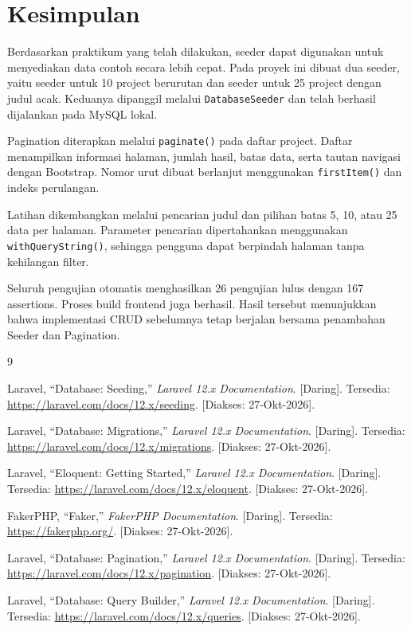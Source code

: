 \documentclass[a4paper,oneside,11pt]{book}
\renewcommand{\_}{\textunderscore\allowbreak{}}
\begin{document}
\chapter{Kesimpulan}

Berdasarkan praktikum yang telah dilakukan, seeder dapat digunakan
untuk menyediakan data contoh secara lebih cepat.
Pada proyek ini dibuat dua seeder, yaitu seeder untuk 10 project
berurutan dan seeder untuk 25 project dengan judul acak.
Keduanya dipanggil melalui \texttt{DatabaseSeeder} dan telah berhasil
dijalankan pada MySQL lokal.

Pagination diterapkan melalui \texttt{paginate()} pada daftar
project. Daftar menampilkan informasi halaman, jumlah hasil, batas
data, serta tautan navigasi dengan Bootstrap.
Nomor urut dibuat berlanjut menggunakan \texttt{firstItem()}
dan indeks perulangan.

Latihan dikembangkan melalui pencarian judul dan pilihan batas
5, 10, atau 25 data per halaman.
Parameter pencarian dipertahankan menggunakan
\texttt{withQueryString()}, sehingga pengguna dapat berpindah halaman
tanpa kehilangan filter.

Seluruh pengujian otomatis menghasilkan 26 pengujian lulus dengan
167 assertions. Proses build frontend juga berhasil.
Hasil tersebut menunjukkan bahwa implementasi CRUD sebelumnya tetap
berjalan bersama penambahan Seeder dan Pagination.

\cleardoublepage
\renewcommand{\bibname}{Daftar Pustaka}

\begin{thebibliography}{9}
\raggedright
\setlength{\itemsep}{0.8em}

Laravel, ``Database: Seeding,''
\textit{Laravel 12.x Documentation}. [Daring].
Tersedia: \url{https://laravel.com/docs/12.x/seeding}.
[Diakses: 27-Okt-2026].

Laravel, ``Database: Migrations,''
\textit{Laravel 12.x Documentation}. [Daring].
Tersedia: \url{https://laravel.com/docs/12.x/migrations}.
[Diakses: 27-Okt-2026].

Laravel, ``Eloquent: Getting Started,''
\textit{Laravel 12.x Documentation}. [Daring].
Tersedia: \url{https://laravel.com/docs/12.x/eloquent}.
[Diakses: 27-Okt-2026].

FakerPHP, ``Faker,''
\textit{FakerPHP Documentation}. [Daring].
Tersedia: \url{https://fakerphp.org/}.
[Diakses: 27-Okt-2026].

Laravel, ``Database: Pagination,''
\textit{Laravel 12.x Documentation}. [Daring].
Tersedia: \url{https://laravel.com/docs/12.x/pagination}.
[Diakses: 27-Okt-2026].

Laravel, ``Database: Query Builder,''
\textit{Laravel 12.x Documentation}. [Daring].
Tersedia: \url{https://laravel.com/docs/12.x/queries}.
[Diakses: 27-Okt-2026].

\end{thebibliography}
\end{document}
